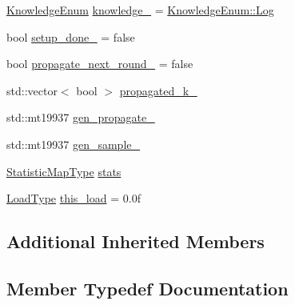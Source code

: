 \begin{DoxyCompactItemize}
\item 
\hyperlink{namespacevt_1_1vrt_1_1collection_1_1lb_a72b44c7e6b2052509331d57b9c94c84a}{Knowledge\+Enum} \hyperlink{structvt_1_1vrt_1_1collection_1_1lb_1_1_tempered_l_b_a4b6087104debbccb5396cb96a599767f}{knowledge\+\_\+} = \hyperlink{namespacevt_1_1vrt_1_1collection_1_1lb_a72b44c7e6b2052509331d57b9c94c84aace0be71e33226e4c1db2bcea5959f16b}{Knowledge\+Enum\+::\+Log}
\item 
bool \hyperlink{structvt_1_1vrt_1_1collection_1_1lb_1_1_tempered_l_b_a79d43538cf3aa0958351404db0753050}{setup\+\_\+done\+\_\+} = false
\item 
bool \hyperlink{structvt_1_1vrt_1_1collection_1_1lb_1_1_tempered_l_b_a64d34e82497889a4d3277f0cb79aa7e1}{propagate\+\_\+next\+\_\+round\+\_\+} = false
\item 
std\+::vector$<$ bool $>$ \hyperlink{structvt_1_1vrt_1_1collection_1_1lb_1_1_tempered_l_b_aed0424ef21a6f06193eaf0f247215836}{propagated\+\_\+k\+\_\+}
\item 
std\+::mt19937 \hyperlink{structvt_1_1vrt_1_1collection_1_1lb_1_1_tempered_l_b_a449632c461159209add8e135b30f3d4f}{gen\+\_\+propagate\+\_\+}
\item 
std\+::mt19937 \hyperlink{structvt_1_1vrt_1_1collection_1_1lb_1_1_tempered_l_b_a714777ab4aebef961c51e38cac9477af}{gen\+\_\+sample\+\_\+}
\item 
\hyperlink{structvt_1_1vrt_1_1collection_1_1lb_1_1_base_l_b_acd9bdad961ac83c96b7a227de672f96c}{Statistic\+Map\+Type} \hyperlink{structvt_1_1vrt_1_1collection_1_1lb_1_1_tempered_l_b_afa55e2bd7b0bbc336dd66daeb155d09c}{stats}
\item 
\hyperlink{structvt_1_1vrt_1_1collection_1_1lb_1_1_base_l_b_a215e22b9f12678303f49615ae3be05cc}{Load\+Type} \hyperlink{structvt_1_1vrt_1_1collection_1_1lb_1_1_tempered_l_b_a07e1e0f447bf9ccbb4637c3212fab2c5}{this\+\_\+load} = 0.\+0f
\end{DoxyCompactItemize}
\subsection*{Additional Inherited Members}


\subsection{Member Typedef Documentation}
\mbox{\label{structvt_1_1vrt_1_1collection_1_1lb_1_1_tempered_l_b_a38d9ad7e92612cdbdf564b6f49b516a7}} 
